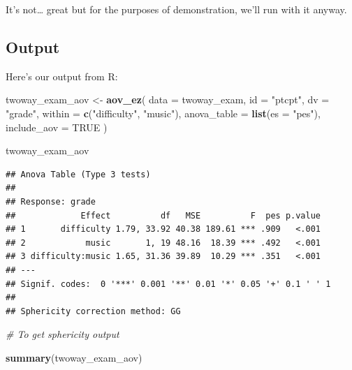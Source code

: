 \documentclass[
]{book}
\newenvironment{Shaded}{\begin{snugshade}}{\end{snugshade}}
\newcommand{\AttributeTok}[1]{\textcolor[rgb]{0.13,0.29,0.53}{#1}}
\newcommand{\CommentTok}[1]{\textcolor[rgb]{0.56,0.35,0.01}{\textit{#1}}}
\newcommand{\ConstantTok}[1]{\textcolor[rgb]{0.56,0.35,0.01}{#1}}
\newcommand{\FunctionTok}[1]{\textcolor[rgb]{0.13,0.29,0.53}{\textbf{#1}}}
\newcommand{\NormalTok}[1]{#1}
\newcommand{\OtherTok}[1]{\textcolor[rgb]{0.56,0.35,0.01}{#1}}
\newcommand{\StringTok}[1]{\textcolor[rgb]{0.31,0.60,0.02}{#1}}
\begin{document}
It's not\ldots{} great but for the purposes of demonstration, we'll run with it anyway.

\subsection{Output}\label{output-8}

Here's our output from R:

\begin{Shaded}
\begin{Highlighting}[]
\NormalTok{twoway\_exam\_aov }\OtherTok{\textless{}{-}} \FunctionTok{aov\_ez}\NormalTok{(}
  \AttributeTok{data =}\NormalTok{ twoway\_exam,}
  \AttributeTok{id =} \StringTok{"ptcpt"}\NormalTok{,}
  \AttributeTok{dv =} \StringTok{"grade"}\NormalTok{,}
  \AttributeTok{within =} \FunctionTok{c}\NormalTok{(}\StringTok{"difficulty"}\NormalTok{, }\StringTok{"music"}\NormalTok{),}
  \AttributeTok{anova\_table =} \FunctionTok{list}\NormalTok{(}\AttributeTok{es =} \StringTok{"pes"}\NormalTok{),}
  \AttributeTok{include\_aov =} \ConstantTok{TRUE}
\NormalTok{)}

\NormalTok{twoway\_exam\_aov}
\end{Highlighting}
\end{Shaded}

\begin{verbatim}
## Anova Table (Type 3 tests)
## 
## Response: grade
##             Effect          df   MSE          F  pes p.value
## 1       difficulty 1.79, 33.92 40.38 189.61 *** .909   <.001
## 2            music       1, 19 48.16  18.39 *** .492   <.001
## 3 difficulty:music 1.65, 31.36 39.89  10.29 *** .351   <.001
## ---
## Signif. codes:  0 '***' 0.001 '**' 0.01 '*' 0.05 '+' 0.1 ' ' 1
## 
## Sphericity correction method: GG
\end{verbatim}

\begin{Shaded}
\begin{Highlighting}[]
\CommentTok{\# To get sphericity output}

\FunctionTok{summary}\NormalTok{(twoway\_exam\_aov)}
\end{Highlighting}
\end{Shaded}
\end{document}
